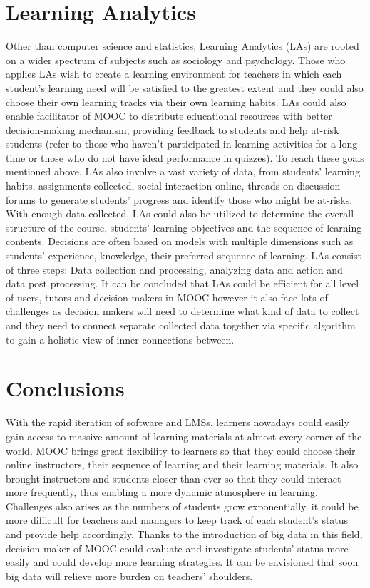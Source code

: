 \documentclass[sigconf]{acmart}
\begin{document}
\section{Learning Analytics}
Other than computer science and statistics, Learning Analytics (LAs) are rooted on a wider spectrum of subjects such as sociology and psychology. Those who applies LAs wish to create a learning environment for teachers in which each student’s learning need will be satisfied to the greatest extent and they could also choose their own learning tracks via their own learning habits. LAs could also enable facilitator of MOOC to distribute educational resources with better decision-making mechanism, providing feedback to students and help at-risk students (refer to those who haven’t participated in learning activities for a long time or those who do not have ideal performance in quizzes).
To reach these goals mentioned above, LAs also involve a vast variety of data, from students’ learning habits, assignments collected, social interaction online, threads on discussion forums to generate students’ progress and identify those who might be at-risks. With enough data collected, LAs could also be utilized to determine the overall structure of the course, students’ learning objectives and the sequence of learning contents. Decisions are often based on models with multiple dimensions such as students’ experience, knowledge, their preferred sequence of learning.
LAs consist of three steps: Data collection and processing, analyzing data and action and data post processing. It can be concluded that LAs could be efficient for all level of users, tutors and decision-makers in MOOC however it also face lots of challenges as decision makers will need to determine what kind of data to collect and they need to connect separate collected data together via specific algorithm to gain a holistic view of inner connections between.

\section{Conclusions}
With the rapid iteration of software and LMSs, learners nowadays could easily gain access to massive amount of learning materials at almost every corner of the world. MOOC brings great flexibility to learners so that they could choose their online instructors, their sequence of learning and their learning materials. It also brought instructors and students closer than ever so that they could interact more frequently, thus enabling a more dynamic atmosphere in learning. Challenges also arises as the numbers of students grow exponentially, it could be more difficult for teachers and managers to keep track of each student’s status and provide help accordingly. Thanks to the introduction of big data in this field, decision maker of MOOC could evaluate and investigate students’ status more easily and could develop more learning strategies. It can be envisioned that soon big data will relieve more burden on teachers’ shoulders.


 
\end{document}
